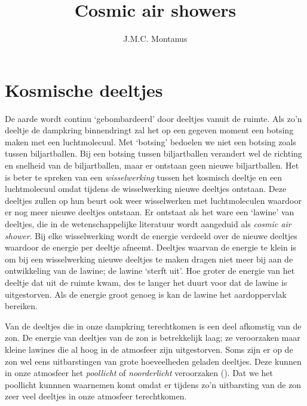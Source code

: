 

\title{Cosmic air showers}
\author{J.M.C. Montanus}



\maketitle

\section{Kosmische deeltjes}

De aarde wordt continu `gebombardeerd' door deeltjes vanuit de ruimte.
Als zo'n deeltje de dampkring binnendringt zal het op een gegeven moment
een botsing maken met een luchtmolecuul. Met `botsing' bedoelen we niet
een botsing zoals tussen biljartballen. Bij een botsing tussen
biljartballen verandert wel de richting en snelheid van de
biljartballen, maar er ontstaan geen nieuwe biljartballen. Het is beter
te spreken van een \emph{wisselwerking} tussen het kosmisch deeltje en
een luchtmolecuul omdat tijdens de wisselwerking nieuwe deeltjes
ontstaan. Deze deeltjes zullen op hun beurt ook weer wisselwerken met
luchtmoleculen waardoor er nog meer nieuwe deeltjes ontstaan. Er
ontstaat als het ware een `lawine' van deeltjes, die in de
wetenschappelijke literatuur wordt aangeduid als \emph{cosmic air
shower}. Bij elke wisselwerking wordt de energie verdeeld over de nieuwe
deeltjes waardoor de energie per deeltje afneemt. Deeltjes waarvan de
energie te klein is om bij een wisselwerking nieuwe deeltjes te maken
dragen niet meer bij aan de ontwikkeling van de lawine; de lawine
`sterft uit'. Hoe groter de energie van het deeltje dat uit de ruimte
kwam, des te langer het duurt voor dat de lawine is uitgestorven. Als de
energie groot genoeg is kan de lawine het aardoppervlak bereiken. 

Van de deeltjes die in onze dampkring terechtkomen is een deel afkomstig
van de zon. De energie van deeltjes van de zon is betrekkelijk laag; ze
veroorzaken maar kleine lawines die al hoog in de atmosfeer zijn
uitgestorven. Soms zijn er op de zon wel eens uitbarstingen van grote
hoeveelheden geladen deeltjes. Deze kunnen in onze atmosfeer het
\emph{poollicht} of \emph{noorderlicht} veroorzaken
(). Dat we het poollicht kunnnen waarnemen komt
omdat er tijdens zo'n uitbarsting van de zon zeer veel deeltjes in onze
atmosfeer terechtkomen.

